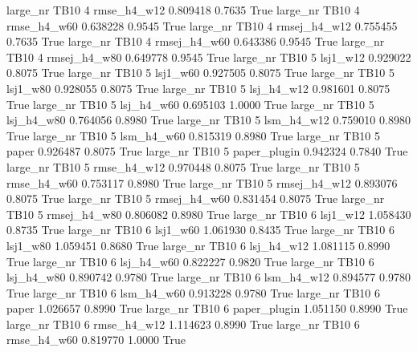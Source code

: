   large_nr     TB10                 4  rmse_h4_w12    0.809418      0.7635    True
  large_nr     TB10                 4  rmse_h4_w60    0.638228      0.9545    True
  large_nr     TB10                 4 rmsej_h4_w12    0.755455      0.7635    True
  large_nr     TB10                 4 rmsej_h4_w60    0.643386      0.9545    True
  large_nr     TB10                 4 rmsej_h4_w80    0.649778      0.9545    True
  large_nr     TB10                 5     lsj1_w12    0.929022      0.8075    True
  large_nr     TB10                 5     lsj1_w60    0.927505      0.8075    True
  large_nr     TB10                 5     lsj1_w80    0.928055      0.8075    True
  large_nr     TB10                 5   lsj_h4_w12    0.981601      0.8075    True
  large_nr     TB10                 5   lsj_h4_w60    0.695103      1.0000    True
  large_nr     TB10                 5   lsj_h4_w80    0.764056      0.8980    True
  large_nr     TB10                 5   lsm_h4_w12    0.759010      0.8980    True
  large_nr     TB10                 5   lsm_h4_w60    0.815319      0.8980    True
  large_nr     TB10                 5        paper    0.926487      0.8075    True
  large_nr     TB10                 5 paper_plugin    0.942324      0.7840    True
  large_nr     TB10                 5  rmse_h4_w12    0.970448      0.8075    True
  large_nr     TB10                 5  rmse_h4_w60    0.753117      0.8980    True
  large_nr     TB10                 5 rmsej_h4_w12    0.893076      0.8075    True
  large_nr     TB10                 5 rmsej_h4_w60    0.831454      0.8075    True
  large_nr     TB10                 5 rmsej_h4_w80    0.806082      0.8980    True
  large_nr     TB10                 6     lsj1_w12    1.058430      0.8735    True
  large_nr     TB10                 6     lsj1_w60    1.061930      0.8435    True
  large_nr     TB10                 6     lsj1_w80    1.059451      0.8680    True
  large_nr     TB10                 6   lsj_h4_w12    1.081115      0.8990    True
  large_nr     TB10                 6   lsj_h4_w60    0.822227      0.9820    True
  large_nr     TB10                 6   lsj_h4_w80    0.890742      0.9780    True
  large_nr     TB10                 6   lsm_h4_w12    0.894577      0.9780    True
  large_nr     TB10                 6   lsm_h4_w60    0.913228      0.9780    True
  large_nr     TB10                 6        paper    1.026657      0.8990    True
  large_nr     TB10                 6 paper_plugin    1.051150      0.8990    True
  large_nr     TB10                 6  rmse_h4_w12    1.114623      0.8990    True
  large_nr     TB10                 6  rmse_h4_w60    0.819770      1.0000    True
